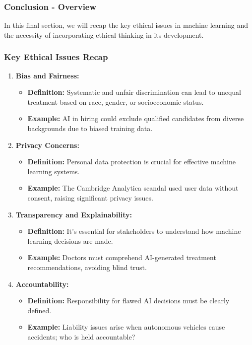 \documentclass[aspectratio=169]{beamer}
\begin{document}
\begin{frame}[fragile]
    \frametitle{Conclusion - Overview}
    In this final section, we will recap the key ethical issues in machine learning and the necessity of incorporating ethical thinking in its development.
\end{frame}

\begin{frame}[fragile]
    \frametitle{Key Ethical Issues Recap}
    \begin{enumerate}
        \item \textbf{Bias and Fairness:}
        \begin{itemize}
            \item \textbf{Definition:} Systematic and unfair discrimination can lead to unequal treatment based on race, gender, or socioeconomic status.
            \item \textbf{Example:} AI in hiring could exclude qualified candidates from diverse backgrounds due to biased training data.
        \end{itemize}
        
        \item \textbf{Privacy Concerns:}
        \begin{itemize}
            \item \textbf{Definition:} Personal data protection is crucial for effective machine learning systems.
            \item \textbf{Example:} The Cambridge Analytica scandal used user data without consent, raising significant privacy issues.
        \end{itemize}
        
        \item \textbf{Transparency and Explainability:}
        \begin{itemize}
            \item \textbf{Definition:} It's essential for stakeholders to understand how machine learning decisions are made.
            \item \textbf{Example:} Doctors must comprehend AI-generated treatment recommendations, avoiding blind trust.
        \end{itemize}
        
        \item \textbf{Accountability:}
        \begin{itemize}
            \item \textbf{Definition:} Responsibility for flawed AI decisions must be clearly defined.
            \item \textbf{Example:} Liability issues arise when autonomous vehicles cause accidents; who is held accountable?
        \end{itemize}
        

\end{enumerate}
\end{frame}
\end{document}
